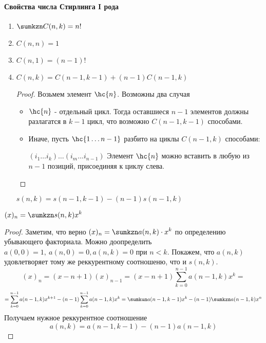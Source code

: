 \documentclass[unicode,10pt]{article}
\begin{document}
\paragraph{Свойства числа Стирлинга I рода}
\begin{enumerate}
  \item $\displaystyle \sumkzn C(n,k) = n!$
  \item $C(n,n) =1$
  \item $ C(n,1) = (n-1)!$ \WHY
  \item $C(n,k) = C(n-1, k-1) + (n-1)C(n-1,k)$
    \begin{proof}
      Возьмем элемент $\hc{n}$. Возможны два случая
      \begin{itemize}
        \item $\hc{n}$ - отдельный цикл. Тогда оставшиеся $n-1$ элементов должны
          разлагатся в $k-1$ цикл, что возможно $C(n-1,k-1)$ способами.
        \item Иначе, пусть $\hc{1\dots n-1}$ разбито на циклы $C(n-1,k)$ способами:\par
          $(i_1\dots i_k)\dots(i_m\dots i_{n-1})$
          Элемент $\hc{n}$ можно вставить в любую из $n-1$ позиций, присоединяя к циклу слева.
      \end{itemize}
    \end{proof}
    \begin{imp}
      $\displaystyle s(n,k) = s(n-1,k-1) - (n-1)s(n-1,k)$
    \end{imp}
\end{enumerate}
\begin{lemma}
  $\displaystyle (x)_n =\sumkzn s(n,k)x^k$
\end{lemma}
\begin{proof}
  Заметим, что верно $\displaystyle (x)_n = \sumkzn a(n,k)\cdot x^k $ по определению убывающего
  факториала. Можно доопределить $a(0,0) =1,\ a(n,0)=0, a(n,k)=0 \text{ при } n<k $.
  Покажем, что $a(n,k)$ удовлетворяет тому же реккурентному соотношеню, что и $s(n,k)$.
  \begin{displaymath}
    (x)_n = (x-n+1)(x)_{n-1} = (x-n+1)\sum_{k=0}^{n-1}a(n-1,k) x^k =
  \end{displaymath}
  \begin{displaymath}
    =\sum_{k=0}^{n-1}a(n-1,k) x^{k+1} - (n-1)\sum_{k=0}^{n-1}a(n-1,k)x^k=\sumkun a(n-1,k-1)x^k
    -(n-1)\sumkzn a(n-1,k) x^n
  \end{displaymath}
  Получаем нужное реккурентное соотношение
  \begin{displaymath}
    a(n,k) = a(n-1, k-1) - (n-1)a(n-1,k)
  \end{displaymath}
\end{proof}
\end{document}
